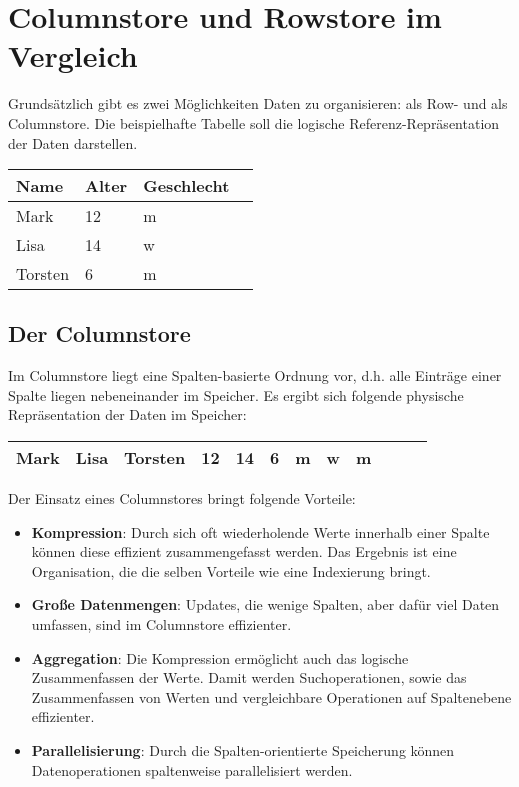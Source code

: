 \chapter{Columnstore und Rowstore im Vergleich}

Grundsätzlich gibt es zwei Möglichkeiten Daten zu organisieren: als Row- und als Columnstore. Die beispielhafte Tabelle soll die logische Referenz-Repräsentation der Daten darstellen.

\begin{center}
    \begin{tabular}{ | l | l | l | l |}
    \hline
    Name & Alter & Geschlecht \\ \hline
    Mark & 12 & m \\ \hline
    Lisa & 14 & w \\ \hline
    Torsten & 6 & m \\ \hline
    \end{tabular}
\end{center}

\section{Der Columnstore}
Im Columnstore liegt eine Spalten-basierte Ordnung vor, d.h. alle Einträge einer Spalte liegen nebeneinander im Speicher. Es ergibt sich folgende physische Repräsentation der Daten im Speicher: 

\begin{center}
    \begin{tabular}{ | l | l | l | l | l | l | l | l | l | l | l | l |}
    \hline
    Mark & Lisa & Torsten & 12 & 14 & 6 & m & w & m \\ \hline
    \end{tabular}
\end{center}

Der Einsatz eines Columnstores bringt folgende Vorteile: 

\begin{itemize}
	\item \textbf{Kompression}: Durch sich oft wiederholende Werte innerhalb einer Spalte können diese effizient zusammengefasst werden. Das Ergebnis ist eine Organisation, die die selben Vorteile wie eine Indexierung bringt. 
    \item \textbf{Große Datenmengen}: Updates, die wenige Spalten, aber dafür viel Daten umfassen, sind im Columnstore effizienter. 
	\item \textbf{Aggregation}: Die Kompression ermöglicht auch das  logische Zusammenfassen der Werte. Damit werden Suchoperationen, sowie das Zusammenfassen von Werten und vergleichbare Operationen auf Spaltenebene effizienter. 
    \item \textbf{Parallelisierung}: Durch die Spalten-orientierte Speicherung können Datenoperationen spaltenweise parallelisiert werden. 
\end{itemize}


